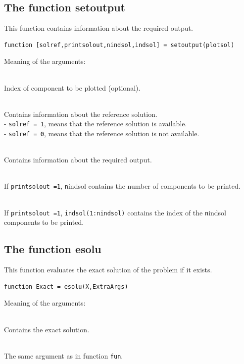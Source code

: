 \documentclass[<options>]{article}
\begin{document}
\subsection{The function setoutput}\label{setout}
This function contains information about the required output.
\begin{verbatim}
function [solref,printsolout,nindsol,indsol] = setoutput(plotsol)
\end{verbatim}
Meaning of the arguments:
\begin{list}
{}{%
  \renewcommand\makelabel[1]{\texttt{#1}\hfill}
}
\item[plotsol]\ \\
Index of component to be plotted (optional).
\item[solref]\ \\
Contains information about the reference solution.\\
- \texttt{solref = 1}, means that the reference solution is available.\\
- \texttt{solref = 0}, means that the reference solution is not available.
\item[printsolout]\ \\
Contains information about the required output.
\item[nindsol]\ \\
If \texttt{printsolout =1}, \texttt nindsol  contains the number of components to
be printed.
\item[indsol]\ \\
If \texttt{printsolout =1}, \texttt{indsol(1:nindsol)}  contains the index of
the \texttt nindsol  components to be printed.
\end{list}
\subsection{The function esolu}\label{esolu}
This function evaluates the exact solution of the problem if it  exists.
\begin{verbatim}
function Exact = esolu(X,ExtraArgs)
\end{verbatim}
Meaning of the arguments:
\begin{list}
{}{%
  \renewcommand\makelabel[1]{\texttt{#1}\hfill}
}
\item[Exact]\ \\
Contains the exact solution.
\item[X, ExtraArgs]\ \\
The same argument as in function \texttt{fun}.
\end{list}
\end{document}
